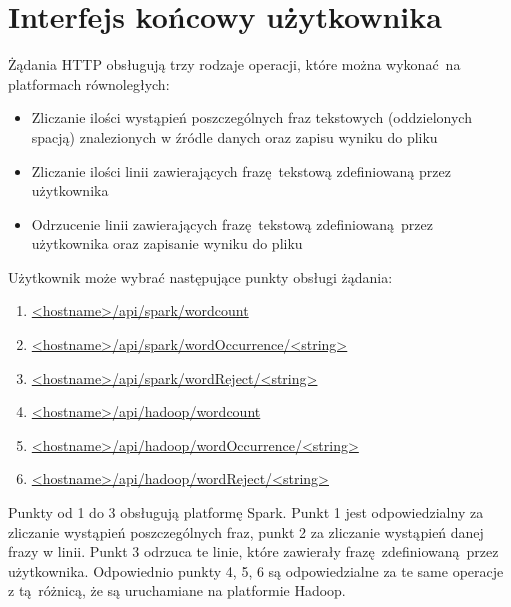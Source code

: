 \section{Interfejs końcowy użytkownika}\label{sec:user_interfaces}
Żądania HTTP obsługują trzy rodzaje operacji, które można wykonać na platformach równoległych:
\begin{itemize}
	\item {Zliczanie ilości wystąpień poszczególnych fraz tekstowych (oddzielonych spacją) znalezionych w źródle danych oraz zapisu wyniku do pliku}
	\item {Zliczanie ilości linii zawierających frazę tekstową zdefiniowaną przez użytkownika}
	\item {Odrzucenie linii zawierających frazę tekstową zdefiniowaną przez użytkownika oraz zapisanie wyniku do pliku}
\end{itemize}
Użytkownik może wybrać następujące punkty obsługi żądania:
\begin{enumerate}
	\item{\url{<hostname>/api/spark/wordcount}}
	\item{\url{<hostname>/api/spark/wordOccurrence/<string> }}
	\item{\url{<hostname>/api/spark/wordReject/<string> }}
	\item{\url{<hostname>/api/hadoop/wordcount}}
	\item{\url{<hostname>/api/hadoop/wordOccurrence/<string>}}
	\item{\url{<hostname>/api/hadoop/wordReject/<string> }}
\end{enumerate}
Punkty od 1 do 3 obsługują platformę Spark. Punkt 1 jest odpowiedzialny za zliczanie wystąpień poszczególnych fraz, punkt 2 za zliczanie wystąpień danej frazy w linii. Punkt 3 odrzuca te linie, które zawierały frazę zdefiniowaną przez użytkownika. Odpowiednio punkty 4, 5, 6 są odpowiedzialne za te same operacje z tą różnicą, że są uruchamiane na platformie Hadoop.  

